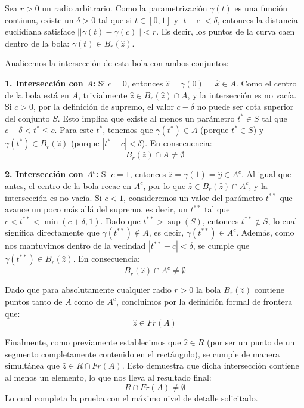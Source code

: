 \documentclass[11pt,letterpaper]{article}
\begin{document}
Sea $r>0$ un radio arbitrario. Como la parametrización $\gamma(t)$ es una función continua, existe un $\delta > 0$ tal que si $t \in [0,1]$ y $|t-c| < \delta$, entonces la distancia euclidiana satisface $||\gamma(t) - \gamma(c)|| < r$. Es decir, los puntos de la curva caen dentro de la bola: $\gamma(t) \in B_{r}(\hat{z})$.

Analicemos la intersección de esta bola con ambos conjuntos:

\textbf{1. Intersección con $A$:}
Si $c = 0$, entonces $\hat{z} = \gamma(0) = \hat{x} \in A$. Como el centro de la bola está en $A$, trivialmente $\hat{z} \in B_{r}(\hat{z}) \cap A$, y la intersección es no vacía.
Si $c > 0$, por la definición de supremo, el valor $c - \delta$ no puede ser cota superior del conjunto $S$. Esto implica que existe al menos un parámetro $t^{*} \in S$ tal que $c - \delta < t^{*} \le c$.
Para este $t^{*}$, tenemos que $\gamma(t^{*}) \in A$ (porque $t^{*} \in S$) y $\gamma(t^{*}) \in B_{r}(\hat{z})$ (porque $|t^{*} - c| < \delta$). En consecuencia:
\begin{equation*}
B_{r}(\hat{z}) \cap A \ne \emptyset
\end{equation*}

\textbf{2. Intersección con $A^{c}$:}
Si $c = 1$, entonces $\hat{z} = \gamma(1) = \hat{y} \in A^{c}$. Al igual que antes, el centro de la bola recae en $A^{c}$, por lo que $\hat{z} \in B_{r}(\hat{z}) \cap A^{c}$, y la intersección es no vacía.
Si $c < 1$, consideremos un valor del parámetro $t^{**}$ que avance un poco más allá del supremo, es decir, un $t^{**}$ tal que $c < t^{**} < \min(c+\delta, 1)$. Dado que $t^{**} > \sup(S)$, entonces $t^{**} \notin S$, lo cual significa directamente que $\gamma(t^{**}) \notin A$, es decir, $\gamma(t^{**}) \in A^{c}$. Además, como nos mantuvimos dentro de la vecindad $|t^{**} - c| < \delta$, se cumple que $\gamma(t^{**}) \in B_{r}(\hat{z})$. En consecuencia:
\begin{equation*}
B_{r}(\hat{z}) \cap A^{c} \ne \emptyset
\end{equation*}

Dado que para absolutamente cualquier radio $r>0$ la bola $B_{r}(\hat{z})$ contiene puntos tanto de $A$ como de $A^{c}$, concluimos por la definición formal de frontera que:
\begin{equation*}
\hat{z} \in Fr(A)
\end{equation*}

Finalmente, como previamente establecimos que $\hat{z} \in R$ (por ser un punto de un segmento completamente contenido en el rectángulo), se cumple de manera simultánea que $\hat{z} \in R \cap Fr(A)$. Esto demuestra que dicha intersección contiene al menos un elemento, lo que nos lleva al resultado final:
\begin{equation*}
R \cap Fr(A) \ne \emptyset
\end{equation*}
Lo cual completa la prueba con el máximo nivel de detalle solicitado.
\end{document}
